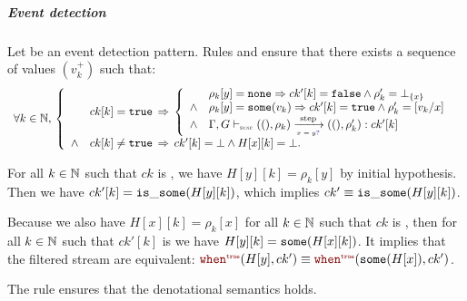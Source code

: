 \begin{skippableproof}
    \subparagraph{Event detection}
    Let  be an event detection pattern. Rules
     and
     ensure that there exists a sequence
    of values $(v_k^+)$ such that:
    \begin{equation*}
        \begin{array}{l}
            \forall k \in \N, \,
            \left\{
            \begin{array}{ll}
                       & ck[k] = \true \, \Rightarrow \,
                \left\{
                \begin{array}{ll}
                           & \rho_k[y] = \none \Rightarrow ck'[k] = \false \wedge \rho'_k = \botrho{\{x\}} \\
                    \wedge & \rho_k[y] = \some{v_k} \Rightarrow ck'[k] = \true \wedge \rho'_k = [v_k / x]  \\
                    \wedge & \epatOpsem{\rho_k}{()}{\detect{x}{y}}{()}{ck'[k]}{\rho'_k}                    \\
                \end{array}
                \right.                                                                          \\
                \wedge & ck[k] \neq \true \, \Rightarrow \, ck'[k] = \bot \wedge H[x][k] = \bot. \\
            \end{array}
            \right.
        \end{array}
    \end{equation*}

    For all $k \in \mathbb{N}$ such that $ck$ is \true, we have $H[y][k] = \rho_k[y]$ by
    initial hypothesis. Then we have $ck'[k] = \mathtt{{is\_some}}(H[y][k])$, which implies $ck' \equiv
        \mathtt{{is\_some}}(H[y][k])$.

    Because we also have $H[x][k] = \rho_k[x]$ for all $k \in \mathbb{N}$ such that $ck$ is
    \true, then for all $k \in \mathbb{N}$ such that $ck'[k]$ is \true we have $H[y][k] =
        \mathtt{{some}}(H[x][k])$. It implies that the filtered stream are equivalent:
    $\whenT{H[y]}{ck'} \equiv \whenT{\some{H[x]}}{ck'}$.

    The rule  ensures that the denotational
    semantics  holds.


\end{skippableproof}
